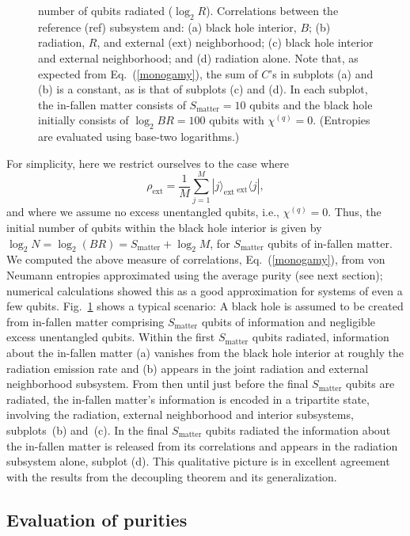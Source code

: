 \documentclass[aps,showpacs,prl,12pt]{revtex4}
\begin{document}
\begin{figure}[ht]
{number of qubits radiated ($\log_2 R$). Correlations between the reference
(ref) subsystem and: (a) black hole interior, $B$; (b) radiation, $R$,
and external ($\text{ext}$) neighborhood; (c) black hole interior
and external neighborhood; and (d) radiation alone. Note that, as
expected from Eq.~(\ref{monogamy}), the sum of $C$'s in subplots (a)
and (b) is a constant, as is that of subplots (c) and (d). In each
subplot, the in-fallen matter consists of $S_{\text{matter}}= 10$ qubits and
the black hole initially consists of $\log_2 BR = 100$ qubits
with $\chi^{(q)}=0$. (Entropies are evaluated using base-two logarithms.)}
\label{results}
\end{figure}

For simplicity, here we restrict ourselves to the case where
\begin{equation}
\rho_{\text{ext}}=\frac{1}{M}\sum_{j=1}^M
 |j\rangle_{\text{ext}}\,{}_{\text{ext}}\!\langle j|,
\end{equation}
and where we assume no excess unentangled qubits, i.e., $\chi^{(q)}=0$.
Thus, the initial number of qubits within the black hole interior is
given by $\log_2 N =\log_2(BR)=S_{\text{matter}}+\log_2 M$, for
$S_{\text{matter}}$ qubits of in-fallen matter. We computed the above
measure of correlations, Eq.~(\ref{monogamy}), from von Neumann
entropies approximated using the average purity (see next section);
numerical calculations showed this as a good approximation
for systems of even a few qubits. Fig.~\ref{results} shows a typical
scenario: A black hole is assumed to be created from in-fallen matter
comprising $S_{\text{matter}}$ qubits of information and
negligible excess unentangled qubits. Within the first $S_{\text{matter}}$
qubits radiated, information about the in-fallen matter (a) vanishes
from the black hole interior at roughly the radiation emission rate
and (b) appears in the joint radiation and external neighborhood
subsystem. From then until just before the final $S_{\text{matter}}$
qubits are radiated, the in-fallen matter's information is encoded in
a tripartite state, involving the radiation, external neighborhood
and interior subsystems, subplots~(b) and~(c). In the final
$S_{\text{matter}}$ qubits radiated the information about the
in-fallen matter is released from its correlations and appears in the
radiation subsystem alone, subplot (d). This qualitative picture is
in excellent agreement with the results from the decoupling
theorem and its generalization.

\subsection*{Evaluation of purities}
\label{purities}
\end{document}
